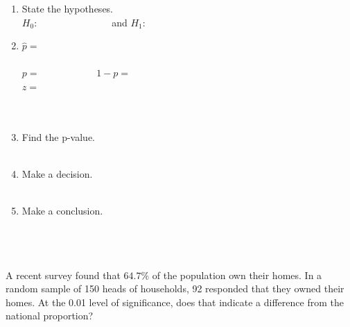 \documentclass[12pt]{article}
\begin{document}
\begin{enumerate}
\begin{enumerate}
\item State the hypotheses.\\
$H_0: \;\;\;\;\;\;\;\;\;\;\;\;\;\;\;\;\;\;\;\;\;\;\;\;\;\; $ and $H_1:$
\item $\hat{p}=$\\
\\
$p= \;\;\;\;\;\;\;\;\;\;\;\;\;\;\;\;\;\;\;\;\; 1-p=$\\
$z=$\\
\\
\\
\item Find the p-value.\\
\\
\item Make a decision.\\
\\
\item Make a conclusion.\\
\\
\\
\\
\end{enumerate}
A recent survey found that $64.7\%$ of the population own their homes. In a random sample of 150 heads of households, 92 responded that they owned their homes. At the 0.01 level of significance, does that indicate a difference from the national proportion?
\end{enumerate}
\end{document}
